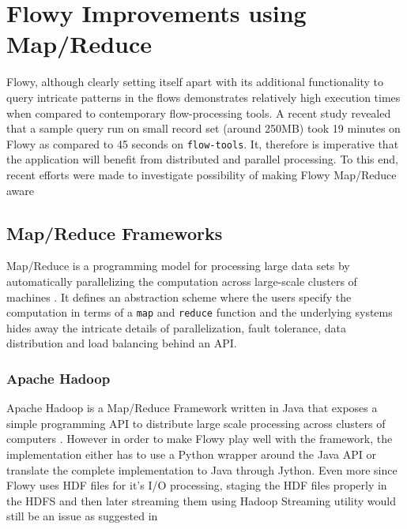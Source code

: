 \chapter{Flowy Improvements using Map/Reduce}\label{ch:flowy-mapreduce}

Flowy, although clearly setting itself apart with its additional functionality to query intricate patterns in the flows demonstrates relatively high execution times when compared to contemporary flow-processing tools. A recent study \cite{pnemeth:thesis:2010} revealed that a sample query run on small record set (around 250MB) took 19 minutes on Flowy as compared to 45 seconds on \texttt{flow-tools}. It, therefore is imperative that the application will benefit from distributed and parallel processing. To this end, recent efforts were made to investigate possibility of making Flowy Map/Reduce aware \cite{pnemeth:thesis:2010}

\section{Map/Reduce Frameworks}\label{sec:map-reduce}

Map/Reduce is a programming model for processing large data sets by automatically parallelizing the computation across large-scale clusters of machines \cite{jdean:2004}. It defines an abstraction scheme where the users specify the computation in terms of a \texttt{map} and \texttt{reduce} function and the underlying systems hides away the intricate details of parallelization, fault tolerance, data distribution and load balancing behind an \ac{API}.

\subsection{Apache Hadoop}\label{subsec:hadoop}
Apache Hadoop is a Map/Reduce Framework written in Java that exposes a simple programming API to distribute large scale processing across clusters of computers \cite{twhite:hadoop:2010}. However in order to make Flowy play well with the framework, the implementation either has to use a Python wrapper around the Java \ac{API} or translate the complete implementation to Java through Jython. Even more since Flowy uses \ac{HDF} files for it's I/O processing, staging the \ac{HDF} files properly in the \ac{HDFS} \cite{kshvachko:2010} and then later streaming them using Hadoop Streaming utility would still be an issue as suggested in \cite{pnemeth:thesis:2010}
	
